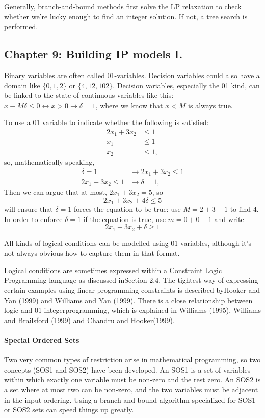 \documentclass[13pt, letterpaper, twoside]{book}
\begin{document}
Generally, branch-and-bound methods first solve the LP relaxation to check whether we're lucky enough to find an integer solution. If not, a tree search is performed. 

\subsection{Chapter 9: Building IP models I.}

Binary variables are often called 01-variables. Decision variables could also have a domain like $\{0,1,2\}$ or $\{4,12,102\}$. Decision variables, especially the 01 kind, can be linked to the state of continuous variables like this: $x-M\delta \leq 0 \leftrightarrow x>0 \rightarrow \delta = 1$, where we know that $x < M$ is always true.

To use a 01 variable to indicate whether the following is satisfied:
\begin{align}
2x_1 + 3x_2 &\leq 1\\
x_1 &\leq 1\\
x_2 &\leq 1,
\end{align}
so, mathematically speaking,
\begin{align}
\delta = 1 &\rightarrow 2x_1 + 3x_2 \leq 1\\
2x_1 + 3x_2 \leq 1 &\rightarrow \delta = 1,
\end{align}
Then we can argue that at most, $2x_1 + 3x_2 = 5$, so
\[
2x_1 + 3x_2 + 4\delta \leq 5
\]
will ensure that $\delta = 1$ forces the equation to be true: use $M = 2 + 3 - 1$ to find $4$. In order to enforce $\delta = 1$ if the equation is true, use $m = 0 + 0 -1$ and write
\[
2x_1 + 3x_2 + \delta \geq 1
\]

All kinds of logical conditions can be modelled using 01 variables, although it's not always obvious how to capture them in that format. 

Logical conditions are sometimes expressed within a Constraint Logic Programming language as discussed inSection 2.4. The tightest way of expressing certain examples using linear programming constraints is described byHooker and Yan (1999) and Williams and Yan (1999). There is a close relationship between logic and 01 integerprogramming, which is explained in Williams (1995), Williams and Brailsford (1999) and Chandru and Hooker(1999).

\paragraph*{Special Ordered Sets}
Two very common types of restriction arise in mathematical programming, so two concepts (SOS1 and SOS2) have been developed. An SOS1 is a set of variables within which exactly one variable must be non-zero and the rest zero. An SOS2 is a set where at most two can be non-zero, and the two variables must be adjacent in the input ordering. Using a branch-and-bound algorithm specialized for SOS1 or SOS2 sets can speed things up greatly.
\end{document}

